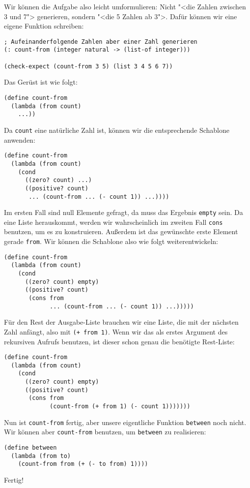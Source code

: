 Wir können die Aufgabe also leicht umformulieren: Nicht "<die Zahlen
zwischen 3 und 7"> generieren, sondern "<die 5 Zahlen ab 3">.  Dafür
können wir eine eigene Funktion schreiben:
%
\begin{lstlisting}
; Aufeinanderfolgende Zahlen aber einer Zahl generieren
(: count-from (integer natural -> (list-of integer)))

(check-expect (count-from 3 5) (list 3 4 5 6 7))
\end{lstlisting}
%
Das Gerüst ist wie folgt:
%
\begin{lstlisting}
(define count-from
  (lambda (from count)
    ...))
\end{lstlisting}
%
Da \lstinline{count} eine natürliche Zahl ist, können wir die
entsprechende Schablone anwenden:
%
\begin{lstlisting}
(define count-from
  (lambda (from count)
    (cond
      ((zero? count) ...)
      ((positive? count)
       ... (count-from ... (- count 1)) ...))))
\end{lstlisting}
%
Im ersten Fall sind null Elemente gefragt, da muss das Ergebnis
\lstinline{empty} sein.  Da eine Liste herauskommt, werden wir
wahrscheinlich im zweiten Fall \lstinline{cons} benutzen, um es zu
konstruieren.  Außerdem ist das gewünschte erste Element gerade
\lstinline{from}.  Wir können die Schablone also wie folgt
weiterentwickeln:
%
\begin{lstlisting}
(define count-from
  (lambda (from count)
    (cond
      ((zero? count) empty)
      ((positive? count)
       (cons from
             ... (count-from ... (- count 1)) ...)))))
\end{lstlisting}
%
Für den Rest der Ausgabe-Liste brauchen wir eine Liste, die mit der
nächsten Zahl anfängt, also mit \lstinline{(+ from 1)}.  Wenn wir das
als erstes Argument des rekursiven Aufrufs benutzen, ist dieser schon
genau die benötigte Rest-Liste:
%
\begin{lstlisting}
(define count-from
  (lambda (from count)
    (cond
      ((zero? count) empty)
      ((positive? count)
       (cons from
             (count-from (+ from 1) (- count 1)))))))
\end{lstlisting}
%
Nun ist \lstinline{count-from} fertig, aber unsere eigentliche Funktion
\lstinline{between} noch nicht.  Wir können aber \lstinline{count-from}
benutzen, um \lstinline{between} zu realisieren:
%
\begin{lstlisting}
(define between
  (lambda (from to)
    (count-from from (+ (- to from) 1))))
\end{lstlisting}
%
Fertig!


